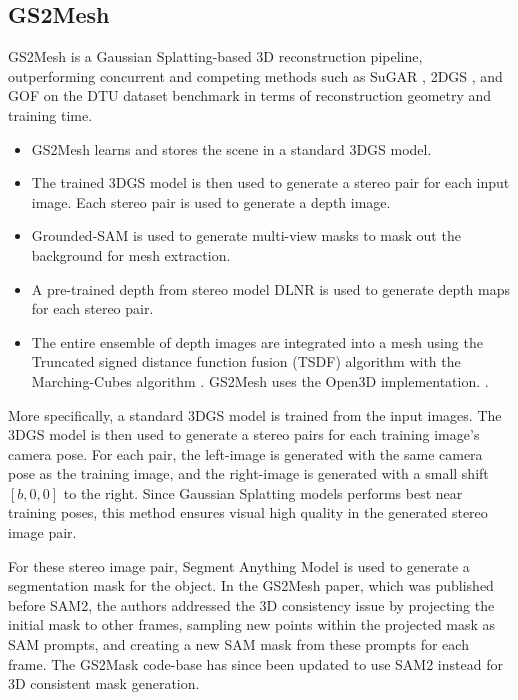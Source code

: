 \subsection{GS2Mesh}
GS2Mesh \cite{2024gs2mesh} is a Gaussian Splatting-based 3D reconstruction pipeline, outperforming concurrent and competing methods such as SuGAR \cite{2024sugar}, 2DGS \cite{20242dgs}, and GOF \cite{2024GOF} on the DTU dataset \cite{2016dtu} benchmark in terms of reconstruction geometry and training time. 
\begin{itemize}
    \item GS2Mesh learns and stores the scene in a standard 3DGS model.
    \item The trained 3DGS model is then used to generate a stereo pair for each input image. Each stereo pair is used to generate a depth image.
    \item Grounded-SAM is used to generate multi-view masks to mask out the background for mesh extraction.
    \item A pre-trained depth from stereo model DLNR is used to generate depth maps for each stereo pair. 
    \item  The entire ensemble of depth images are integrated into a mesh using the Truncated signed distance function fusion (TSDF) algorithm \cite{1996tsdf} with the Marching-Cubes algorithm \cite{1998marchingcubes}. GS2Mesh uses the Open3D implementation. \cite{2018open3d}.
\end{itemize}

More specifically, a standard 3DGS model is trained from the input images. The 3DGS model is then used to generate a stereo pairs for each training image's camera pose. For each pair, the left-image is generated with the same camera pose as the training image, and the right-image is generated with a small shift $[b,0,0]$ to the right. Since Gaussian Splatting models performs best near training poses, this method ensures visual high quality in the generated stereo image pair.

For these stereo image pair, Segment Anything Model is used to generate a segmentation mask for the object. In the GS2Mesh paper, which was published before SAM2, the authors addressed the 3D consistency issue by projecting the initial mask to other frames, sampling new points within the projected mask as SAM prompts, and creating a new SAM mask from these prompts for each frame. The GS2Mask code-base has since been updated to use SAM2 instead for 3D consistent mask generation. 

